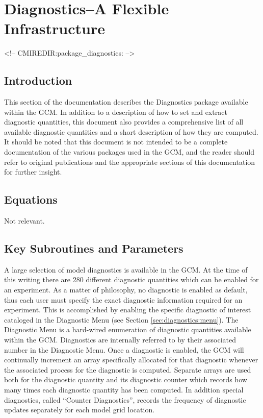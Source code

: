 \section{Diagnostics--A Flexible Infrastructure}
\label{sec:pkg:diagnostics}
\begin{rawhtml}
<!-- CMIREDIR:package_diagnostics: -->
\end{rawhtml}

\subsection{Introduction}

This section of the documentation describes the Diagnostics package available within 
the GCM.  In addition to a description of how to set and extract diagnostic quantities, 
this document also provides a comprehensive list of all available diagnostic quantities 
and a short description of how they are computed.  It should be noted that this document 
is not intended to be a complete documentation of the various packages used in the GCM, 
and the reader should refer to original publications and the appropriate sections of this
documentation for further insight.

\subsection{Equations}
Not relevant.

\subsection{Key Subroutines and Parameters}
\label{sec:diagnostics:diagover}

A large selection of model diagnostics is available in the GCM.  At the time of
this writing there are 280 different diagnostic quantities which can be enabled for an
experiment.  As a matter of philosophy, no diagnostic is enabled as default, thus each 
user must specify the exact diagnostic information required for an experiment.  This 
is accomplished by enabling the specific diagnostic of interest cataloged in the 
Diagnostic Menu (see Section \ref{sec:diagnostics:menu}).
The Diagnostic Menu is a hard-wired enumeration of diagnostic quantities available within 
the GCM. Diagnostics are internally referred to by their associated number in the Diagnostic
Menu.  Once a diagnostic is enabled, the GCM will continually increment an array
specifically allocated for that diagnostic whenever the associated process for the 
diagnostic is computed.  Separate arrays are used both for the diagnostic quantity and 
its diagnostic counter which records how many times each diagnostic quantity has been 
computed.  In addition special diagnostics, called ``Counter Diagnostics'', records the 
frequency of diagnostic updates separately for each model grid location.

